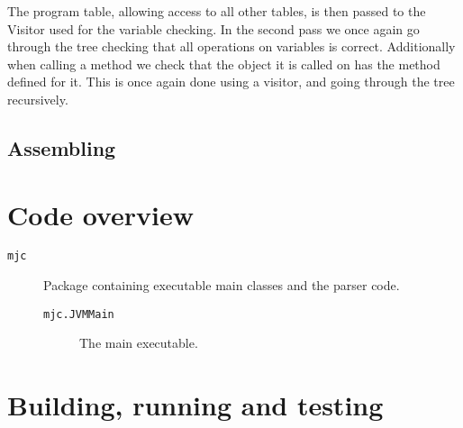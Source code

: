 \documentclass[a4paper]{article}
\begin{document}
The program table, allowing access to all other tables, is then passed to the Visitor used for the variable checking. In the second pass we once again go through the tree checking that all operations on variables is correct. Additionally when calling a method we check that the object it is called on has the method defined for it. This is once again done using a visitor, and going through the tree recursively.

\subsection{Assembling}


\section{Code overview}

\begin{description}
\item[\texttt{mjc}] Package containing executable main classes and the parser
    code.
    \begin{description}
        \item[\texttt{mjc.JVMMain}] The main executable.
    \end{description}
\end{description}

\section{Building, running and testing}
\end{document}
